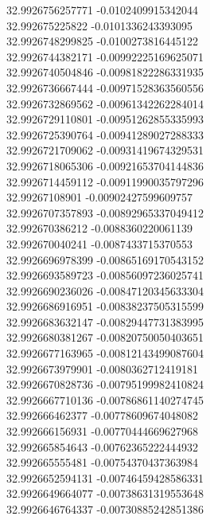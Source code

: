 {32.9926756257771	-0.0102409915342044\\
32.992675225822	-0.0101336243393095\\
32.9926748299825	-0.0100273816445122\\
32.9926744382171	-0.00992225169625071\\
32.9926740504846	-0.00981822286331935\\
32.9926736667444	-0.00971528363560556\\
32.9926732869562	-0.00961342262284014\\
32.9926729110801	-0.00951262855335993\\
32.9926725390764	-0.00941289027288333\\
32.9926721709062	-0.00931419674329531\\
32.9926718065306	-0.00921653704144836\\
32.9926714459112	-0.00911990035797296\\
32.99267108901	-0.00902427599609757\\
32.9926707357893	-0.00892965337049412\\
32.992670386212	-0.0088360220061139\\
32.992670040241	-0.0087433715370553\\
32.9926696978399	-0.00865169170543152\\
32.9926693589723	-0.00856097236025741\\
32.9926690236026	-0.00847120345633304\\
32.9926686916951	-0.00838237505315599\\
32.9926683632147	-0.00829447731383995\\
32.9926680381267	-0.00820750050403651\\
32.9926677163965	-0.00812143499087604\\
32.9926673979901	-0.0080362712419181\\
32.9926670828736	-0.00795199982410824\\
32.9926667710136	-0.00786861140274745\\
32.992666462377	-0.00778609674048082\\
32.992666156931	-0.00770444669627968\\
32.992665854643	-0.00762365222444932\\
32.992665555481	-0.00754370437363984\\
32.9926652594131	-0.00746459428586331\\
32.9926649664077	-0.00738631319553648\\
32.9926646764337	-0.00730885242851386\\
}
